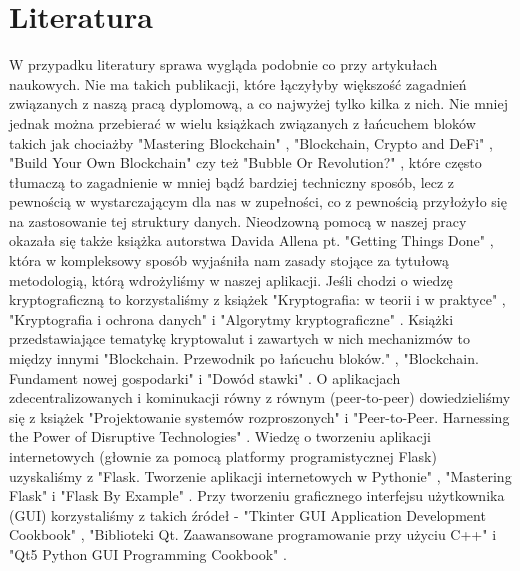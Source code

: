 \section{Literatura}
\label{sec:Literatura}
W przypadku literatury sprawa wygląda podobnie co przy artykułach naukowych. Nie ma takich publikacji, które łączyłyby większość zagadnień związanych z naszą pracą dyplomową, a co najwyżej tylko kilka z nich. Nie mniej jednak można przebierać w wielu książkach związanych z łańcuchem bloków takich jak chociażby "Mastering Blockchain" \cite{MasteringBlockchain}, "Blockchain, Crypto and DeFi" \cite{BCDF}, "Build Your Own Blockchain" \cite{BuildBlockchain} czy też "Bubble Or Revolution?" \cite{BubbleOrRevolution}, które często tłumaczą to zagadnienie w mniej bądź bardziej techniczny sposób, lecz z pewnością w wystarczającym dla nas w zupełności, co z pewnością przyłożyło się na zastosowanie tej struktury danych. Nieodzowną pomocą w naszej pracy okazała się także książka autorstwa Davida Allena pt. "Getting Things Done" \cite{GTD}, która w kompleksowy sposób wyjaśniła nam zasady stojące za tytułową metodologią, którą wdrożyliśmy w naszej aplikacji. Jeśli chodzi o wiedzę kryptograficzną to korzystaliśmy z książek "Kryptografia: w teorii i w praktyce" \cite{KryptografiaWTeoriiPraktyce}, "Kryptografia i ochrona danych" \cite{KryptografiaOchronaDanych} i "Algorytmy kryptograficzne" \cite{AlgorytmyKryptograficzne}. Książki przedstawiające tematykę kryptowalut i zawartych w nich mechanizmów to między innymi "Blockchain. Przewodnik po łańcuchu bloków." \cite{BlockchainPrzewodnikPoLanuchu}, "Blockchain. Fundament nowej gospodarki" \cite{BlockchainFundamentGospodarki} i "Dowód stawki" \cite{DowodStawki}. O aplikacjach zdecentralizowanych i kominukacji równy z równym (peer-to-peer) dowiedzieliśmy się z książek "Projektowanie systemów rozproszonych" \cite{ProjektowanieSystemowRozproszonych} i "Peer-to-Peer. Harnessing the Power of Disruptive Technologies" \cite{PeerToPeer}. Wiedzę o tworzeniu aplikacji internetowych (głownie za pomocą platformy programistycznej Flask) uzyskaliśmy z "Flask. Tworzenie aplikacji internetowych w Pythonie" \cite{FlaskTworzenieAplikacji}, "Mastering Flask" \cite{MasteringFlask} i "Flask By Example" \cite{FlaskExample}. Przy tworzeniu graficznego interfejsu użytkownika (GUI) korzystaliśmy z takich źródeł - "Tkinter GUI Application Development Cookbook" \cite{TkinterCookbook}, "Biblioteki Qt. Zaawansowane programowanie przy użyciu C++" \cite{BibliotekiQt} i "Qt5 Python GUI Programming Cookbook" \cite{QTPython}. %



